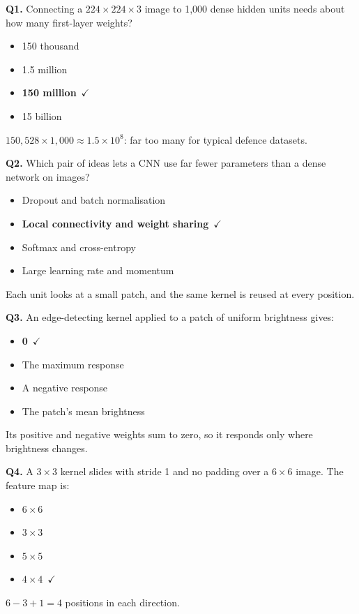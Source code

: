 \documentclass[11pt]{article}
\begin{document}
{\small

\noindent\textbf{Q1.} Connecting a $224\times224\times3$ image to 1,000 dense hidden units needs about how many first-layer weights?\begin{itemize}[leftmargin=2.2em,itemsep=0pt,topsep=1pt]\item[A.] 150 thousand\item[B.] 1.5 million\item[\textbf{C.}] \textbf{150 million}~{\color{GrnN}$\checkmark$}\item[D.] 15 billion\end{itemize} $150{,}528\times1{,}000\approx1.5\times10^8$: far too many for typical defence datasets.\par\medskip

\noindent\textbf{Q2.} Which pair of ideas lets a CNN use far fewer parameters than a dense network on images?\begin{itemize}[leftmargin=2.2em,itemsep=0pt,topsep=1pt]\item[A.] Dropout and batch normalisation\item[\textbf{B.}] \textbf{Local connectivity and weight sharing}~{\color{GrnN}$\checkmark$}\item[C.] Softmax and cross-entropy\item[D.] Large learning rate and momentum\end{itemize} Each unit looks at a small patch, and the same kernel is reused at every position.\par\medskip

\noindent\textbf{Q3.} An edge-detecting kernel applied to a patch of uniform brightness gives:\begin{itemize}[leftmargin=2.2em,itemsep=0pt,topsep=1pt]\item[\textbf{A.}] \textbf{0}~{\color{GrnN}$\checkmark$}\item[B.] The maximum response\item[C.] A negative response\item[D.] The patch's mean brightness\end{itemize} Its positive and negative weights sum to zero, so it responds only where brightness changes.\par\medskip

\noindent\textbf{Q4.} A $3\times3$ kernel slides with stride 1 and no padding over a $6\times6$ image. The feature map is:\begin{itemize}[leftmargin=2.2em,itemsep=0pt,topsep=1pt]\item[A.] $6\times6$\item[B.] $3\times3$\item[C.] $5\times5$\item[\textbf{D.}] \textbf{$4\times4$}~{\color{GrnN}$\checkmark$}\end{itemize} $6-3+1=4$ positions in each direction.\par\medskip

}
\end{document}
